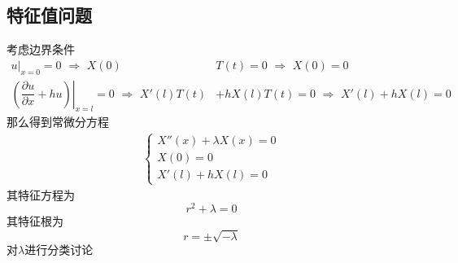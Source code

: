 \subsection{特征值问题}
考虑边界条件
\begin{align*}
	\left. u \right|_{x =0} =0 \,\, \Rightarrow \,\, X(0)&T(t) = 0 \,\, \Rightarrow \, \, X(0) = 0\\
	\left. \left(\dfrac{\partial u}{\partial x} + hu\right)\right|_{x = l} = 0 \, \, \Rightarrow \,\, X'(l)T(t) &+ h X(l)T(t) = 0  \, \, \Rightarrow \,\,  X'(l) + hX(l) = 0
\end{align*}
那么得到常微分方程
\begin{align}
	\begin{cases}
		X''(x) + \lambda X(x) = 0\\
		X(0) = 0\\
		X'(l) + hX(l) = 0
	\end{cases}
\end{align}
其特征方程为
\begin{equation}
	r^2 + \lambda = 0
\end{equation}
其特征根为
\begin{equation}
	r = \pm \sqrt{- \lambda}
\end{equation}
对$\lambda$进行分类讨论
